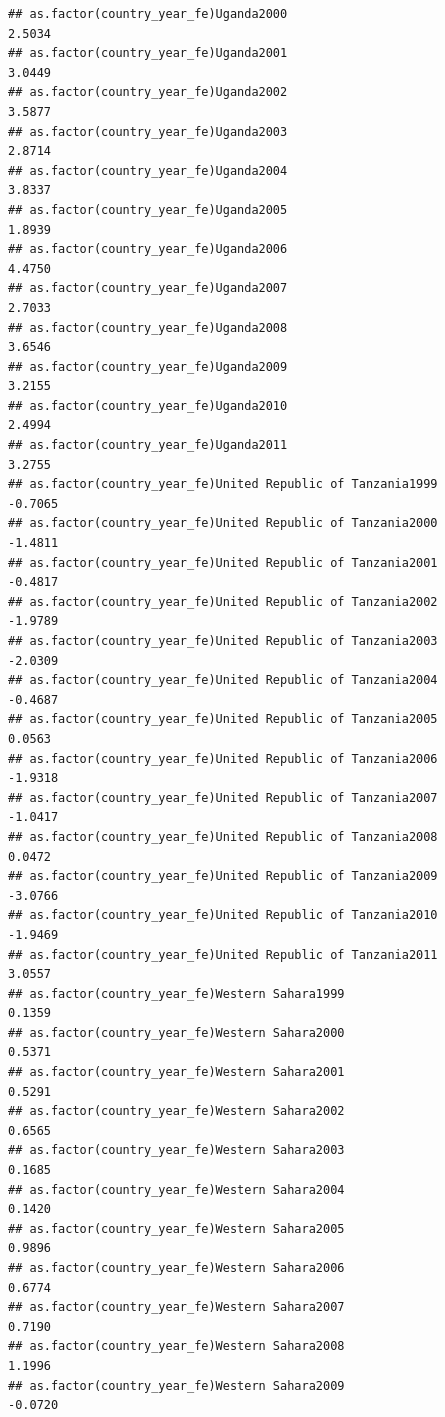 \documentclass[
  a4paper,
]{article}
\begin{document}
\begin{verbatim}
## as.factor(country_year_fe)Uganda2000                            2.5034
## as.factor(country_year_fe)Uganda2001                            3.0449
## as.factor(country_year_fe)Uganda2002                            3.5877
## as.factor(country_year_fe)Uganda2003                            2.8714
## as.factor(country_year_fe)Uganda2004                            3.8337
## as.factor(country_year_fe)Uganda2005                            1.8939
## as.factor(country_year_fe)Uganda2006                            4.4750
## as.factor(country_year_fe)Uganda2007                            2.7033
## as.factor(country_year_fe)Uganda2008                            3.6546
## as.factor(country_year_fe)Uganda2009                            3.2155
## as.factor(country_year_fe)Uganda2010                            2.4994
## as.factor(country_year_fe)Uganda2011                            3.2755
## as.factor(country_year_fe)United Republic of Tanzania1999      -0.7065
## as.factor(country_year_fe)United Republic of Tanzania2000      -1.4811
## as.factor(country_year_fe)United Republic of Tanzania2001      -0.4817
## as.factor(country_year_fe)United Republic of Tanzania2002      -1.9789
## as.factor(country_year_fe)United Republic of Tanzania2003      -2.0309
## as.factor(country_year_fe)United Republic of Tanzania2004      -0.4687
## as.factor(country_year_fe)United Republic of Tanzania2005       0.0563
## as.factor(country_year_fe)United Republic of Tanzania2006      -1.9318
## as.factor(country_year_fe)United Republic of Tanzania2007      -1.0417
## as.factor(country_year_fe)United Republic of Tanzania2008       0.0472
## as.factor(country_year_fe)United Republic of Tanzania2009      -3.0766
## as.factor(country_year_fe)United Republic of Tanzania2010      -1.9469
## as.factor(country_year_fe)United Republic of Tanzania2011       3.0557
## as.factor(country_year_fe)Western Sahara1999                    0.1359
## as.factor(country_year_fe)Western Sahara2000                    0.5371
## as.factor(country_year_fe)Western Sahara2001                    0.5291
## as.factor(country_year_fe)Western Sahara2002                    0.6565
## as.factor(country_year_fe)Western Sahara2003                    0.1685
## as.factor(country_year_fe)Western Sahara2004                    0.1420
## as.factor(country_year_fe)Western Sahara2005                    0.9896
## as.factor(country_year_fe)Western Sahara2006                    0.6774
## as.factor(country_year_fe)Western Sahara2007                    0.7190
## as.factor(country_year_fe)Western Sahara2008                    1.1996
## as.factor(country_year_fe)Western Sahara2009                   -0.0720

\end{verbatim}
\end{document}
